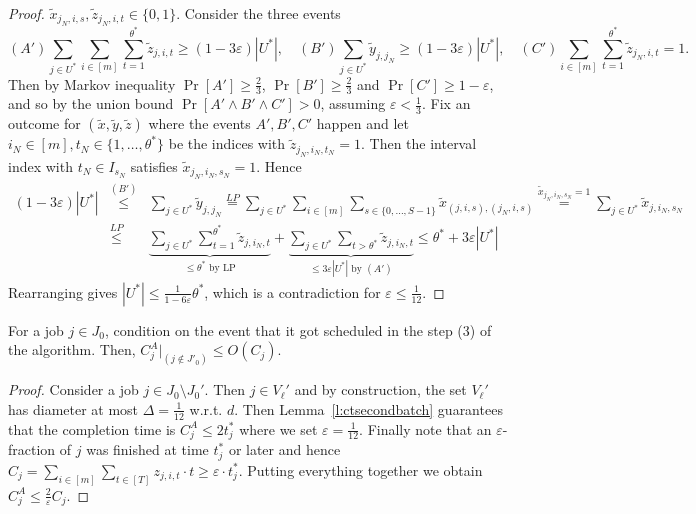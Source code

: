 \begin{proof}
$\tilde{x}_{j_N,i,s},\tilde{z}_{j_N,i,t} \in \{ 0,1\}$.
Consider the three events
  \[
(A') \sum_{j \in U^*} \sum_{i \in [m]} \sum_{t=1}^{\theta^*} \tilde{z}_{j,i,t} \geq (1-3\varepsilon)|U^*|, \quad (B')  \sum_{j \in U^*} \tilde{y}_{j,j_N} \geq (1-3\varepsilon)|U^*|, \quad   (C') \sum_{i \in [m]} \sum_{t=1}^{\theta^*} \tilde{z}_{j_N,i,t} = 1.
\]
Then by Markov inequality $\Pr[A'] \geq \frac{2}{3}$, $\Pr[B'] \geq \frac{2}{3}$ and $\Pr[C'] \geq 1-\varepsilon$, and so by the union bound
$\Pr[A' \wedge B' \wedge C'] > 0$, assuming $\varepsilon < \frac{1}{3}$.
Fix an outcome for $(\tilde{x},\tilde{y},\tilde{z})$ where the events $A',B',C'$ happen and let $i_N \in [m],t_N \in \{ 1,\ldots,\theta^*\}$ be the indices with $\tilde{z}_{j_N,i_N,t_N}=1$. Then the interval index with $t_N \in I_{s_N}$ satisfies $\tilde{x}_{j_N,i_N,s_N}=1$. Hence
\begin{eqnarray*}
  (1-3\varepsilon) |U^*| &\stackrel{(B')}{\leq}& \sum_{j \in U^*} \tilde{y}_{j,j_N} \stackrel{LP}{=} \sum_{j \in U^*} \sum_{i \in [m]} \sum_{s \in \{ 0,\ldots,S-1\}} \tilde{x}_{(j,i,s),(j_N,i,s)} \stackrel{\tilde{x}_{j_N,i_N,s_N}=1}{=} \sum_{j \in U^*} \tilde{x}_{j,i_N,s_N} \\
  &\stackrel{LP}{\leq}& \underbrace{\sum_{j \in U^*} \sum_{t=1}^{\theta^*} \tilde{z}_{j,i_N,t}}_{\leq \theta^*\textrm{ by LP}} + \underbrace{\sum_{j \in U^*} \sum_{t > \theta^*} \tilde{z}_{j,i_N,t}}_{\leq 3\varepsilon |U^*|\textrm{ by }(A')} \leq \theta^* + 3\varepsilon |U^*|
\end{eqnarray*}
Rearranging gives $|U^*| \leq \frac{1}{1-6\varepsilon} \theta^*$, which is a contradiction for $\varepsilon \leq \frac{1}{12}$.
\end{proof}



\begin{lemma}
\label{l:jnot}
For a job $j \in J_0$, condition on the event that it got scheduled in the step (3) of the algorithm. 
Then, $C^A_j |_{(j \not \in J'_0)} \leq O(C_{j})$.
\end{lemma}
\begin{proof}
  Consider a job $j \in J_0 \setminus J_0'$. Then $j \in V_{\ell}'$ and by construction, the
  set $V_{\ell}'$ has diameter at most $\Delta = \frac{1}{12}$ w.r.t. $d$.
  Then Lemma~\ref{l:ctsecondbatch} guarantees that the completion time is $C_j^A \leq 2t_j^*$ where
  we set $\varepsilon = \frac{1}{12}$.
  Finally note that an $\varepsilon$-fraction of $j$ was finished at time $t_j^*$ or later and hence
  $C_j = \sum_{i \in [m]} \sum_{t \in [T]} z_{j,i,t} \cdot t \geq \varepsilon \cdot t_j^*$. 
 Putting everything together we obtain $C_j^A \leq \frac{2}{\varepsilon} C_j$.
\end{proof}



